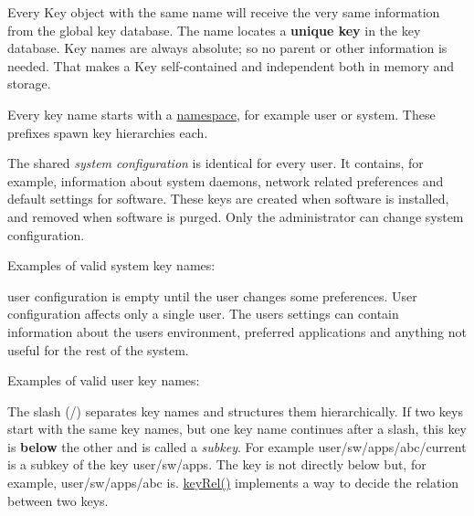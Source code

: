 Every {\ttfamily Key} object with the same name will receive the very same information from the global key database. The name locates a {\bfseries unique key} in the key database. Key names are always absolute; so no parent or other information is needed. That makes a {\ttfamily Key} self-\/contained and independent both in memory and storage.

Every key name starts with a \hyperlink{md_doc_help_elektra-namespaces_doc_help_elektra-namespaces_md}{namespace}, for example {\ttfamily user} or {\ttfamily system}. These prefixes spawn key hierarchies each.

The shared {\itshape system configuration} is identical for every user. It contains, for example, information about system daemons, network related preferences and default settings for software. These keys are created when software is installed, and removed when software is purged. Only the administrator can change system configuration.

Examples of valid system key names\+: 


user configuration is empty until the user changes some preferences. User configuration affects only a single user. The user\textquotesingle{}s settings can contain information about the user\textquotesingle{}s environment, preferred applications and anything not useful for the rest of the system.

Examples of valid user key names\+: 


The slash ({\ttfamily /}) separates key names and structures them hierarchically. If two keys start with the same key names, but one key name continues after a slash, this key is {\bfseries below} the other and is called a {\itshape subkey}. For example {\ttfamily user/sw/apps/abc/current} is a subkey of the key {\ttfamily user/sw/apps}. The key is not directly below but, for example, {\ttfamily user/sw/apps/abc} is. {\ttfamily \hyperlink{group__keytest_ga6bb0f95ac34ce9c42d61bb35a76139d0}{key\+Rel()}} implements a way to decide the relation between two keys.

